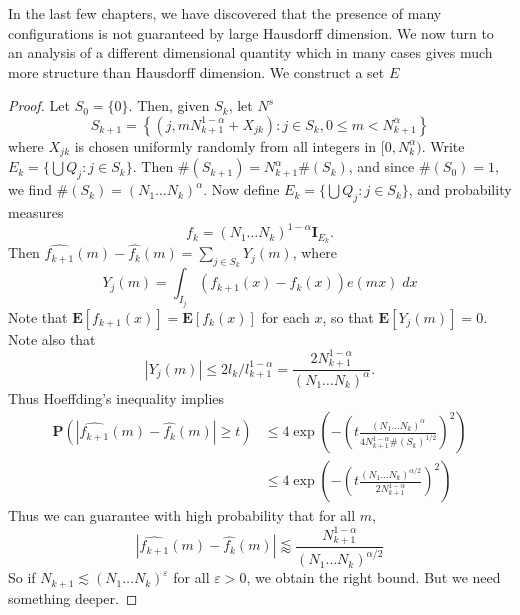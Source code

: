 In the last few chapters, we have discovered that the presence of many configurations is not guaranteed by large Hausdorff dimension. We now turn to an analysis of a different dimensional quantity which in many cases gives much more structure than Hausdorff dimension. We construct a set $E$

\begin{proof}
	Let $S_0 = \{ 0 \}$. Then, given $S_k$, let $N^s$
	\[ S_{k+1} = \left\{ (j, mN_{k+1}^{1-\alpha} + X_{jk}) : j \in S_k, 0 \leq m < N_{k+1}^\alpha \right\} \]
	where $X_{jk}$ is chosen uniformly randomly from all integers in $[0,N_k^\alpha)$. Write $E_k = \{ \bigcup Q_j : j \in S_k \}$. Then $\#(S_{k+1}) = N_{k+1}^\alpha \#(S_k)$, and since $\#(S_0) = 1$, we find $\#(S_k) = (N_1 \dots N_k)^\alpha$. Now define $E_k = \{ \bigcup Q_j : j \in S_k \}$, and probability measures
	\[ f_k = (N_1 \dots N_k)^{1 - \alpha} \mathbf{I}_{E_k}. \]
	Then $\widehat{f_{k+1}}(m) - \widehat{f_k}(m) = \sum_{j \in S_k} Y_j(m)$, where
	\[ Y_j(m) = \int_{I_j} (f_{k+1}(x) - f_k(x)) e(mx)\; dx \]
	Note that $\mathbf{E}[f_{k+1}(x)] = \mathbf{E}[f_k(x)]$ for each $x$, so that $\mathbf{E}[Y_j(m)] = 0$. Note also that
	\[ |Y_j(m)| \leq 2l_k / l_{k+1}^{1-\alpha} = \frac{2 N_{k+1}^{1-\alpha}}{(N_1 \dots N_k)^\alpha}. \]
	Thus Hoeffding's inequality implies
	\begin{align*}
		\mathbf{P} \left( |\widehat{f_{k+1}}(m) - \widehat{f_k}(m)| \geq t \right) &\leq 4 \exp \left( - \left( t \frac{(N_1 \dots N_k)^\alpha}{4 N_{k+1}^{1-\alpha} \#(S_k)^{1/2}} \right)^2 \right)\\
		&\leq 4 \exp \left( - \left( t \frac{(N_1 \dots N_k)^{\alpha/2}}{2 N_{k+1}^{1-\alpha}} \right)^2 \right)
	\end{align*}
	Thus we can guarantee with high probability that for all $m$,
	\[ |\widehat{f_{k+1}}(m) - \widehat{f_k}(m)| \lessapprox \frac{N_{k+1}^{1-\alpha}}{(N_1 \dots N_k)^{\alpha/2}} \]
	So if $N_{k+1} \lesssim (N_1 \dots N_k)^\varepsilon$ for all $\varepsilon > 0$, we obtain the right bound. But we need something deeper.


\end{proof}
